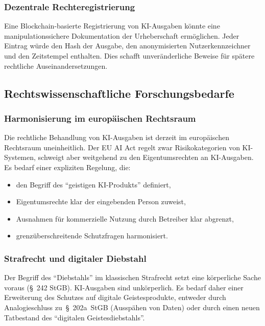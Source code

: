 ﻿\documentclass[a4paper,12pt]{article}
\theoremstyle{definition}
\begin{document}
\subsubsection{Dezentrale Rechteregistrierung}

Eine Blockchain-basierte Registrierung von KI-Ausgaben könnte eine manipulationssichere
Dokumentation der Urheberschaft ermöglichen. Jeder Eintrag würde den Hash der Ausgabe,
den anonymisierten Nutzerkennzeichner und den Zeitstempel enthalten. Dies schafft
unveränderliche Beweise für spätere rechtliche Auseinandersetzungen.

\subsection{Rechtswissenschaftliche Forschungsbedarfe}

\subsubsection{Harmonisierung im europäischen Rechtsraum}

Die rechtliche Behandlung von KI-Ausgaben ist derzeit im europäischen Rechtsraum
uneinheitlich. Der EU AI Act \cite{euaiact2024} regelt zwar Risikokategorien von
KI-Systemen, schweigt aber weitgehend zu den Eigentumsrechten an KI-Ausgaben. Es bedarf
einer expliziten Regelung, die:
\begin{itemize}
    \item den Begriff des ``geistigen KI-Produkts'' definiert,
    \item Eigentumsrechte klar der eingebenden Person zuweist,
    \item Ausnahmen für kommerzielle Nutzung durch Betreiber klar abgrenzt,
    \item grenzüberschreitende Schutzfragen harmonisiert.
\end{itemize}

\subsubsection{Strafrecht und digitaler Diebstahl}

Der Begriff des ``Diebstahls'' im klassischen Strafrecht setzt eine körperliche Sache
voraus (\S{}~242 StGB). KI-Ausgaben sind unkörperlich. Es bedarf daher einer Erweiterung
des Schutzes auf digitale Geistesprodukte, entweder durch Analogieschluss zu~\S{}~202a~StGB
(Ausspähen von Daten) oder durch einen neuen Tatbestand des ``digitalen Geistesdiebstahls''.
\end{document}
